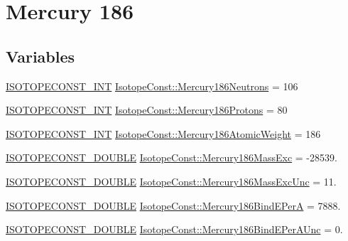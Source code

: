 \hypertarget{group___isotope_const-_mercury-_hg186}{}\section{Mercury 186}
\label{group___isotope_const-_mercury-_hg186}
\subsection*{Variables}
\begin{DoxyCompactItemize}
\item 
\mbox{\hyperlink{group___isotope_const-_macros_ga5f18360b3e99483a35c32d789e62621c}{I\+S\+O\+T\+O\+P\+E\+C\+O\+N\+S\+T\+\_\+\+I\+NT}} \mbox{\hyperlink{group___isotope_const-_mercury-_hg186_ga69b4b099cb39fcc9a1ffc39c8e504890}{Isotope\+Const\+::\+Mercury186\+Neutrons}} = 106
\item 
\mbox{\hyperlink{group___isotope_const-_macros_ga5f18360b3e99483a35c32d789e62621c}{I\+S\+O\+T\+O\+P\+E\+C\+O\+N\+S\+T\+\_\+\+I\+NT}} \mbox{\hyperlink{group___isotope_const-_mercury-_hg186_ga8940396a78f6a6de3cecfa06521c812c}{Isotope\+Const\+::\+Mercury186\+Protons}} = 80
\item 
\mbox{\hyperlink{group___isotope_const-_macros_ga5f18360b3e99483a35c32d789e62621c}{I\+S\+O\+T\+O\+P\+E\+C\+O\+N\+S\+T\+\_\+\+I\+NT}} \mbox{\hyperlink{group___isotope_const-_mercury-_hg186_ga7d94c8cda4bbcb1fbfac6de280e3be9b}{Isotope\+Const\+::\+Mercury186\+Atomic\+Weight}} = 186
\item 
\mbox{\hyperlink{group___isotope_const-_macros_ga8f45a7272ce02c0b4c65c44636ed719a}{I\+S\+O\+T\+O\+P\+E\+C\+O\+N\+S\+T\+\_\+\+D\+O\+U\+B\+LE}} \mbox{\hyperlink{group___isotope_const-_mercury-_hg186_gaa486a18381e5afef36969aa7e3eb75c1}{Isotope\+Const\+::\+Mercury186\+Mass\+Exc}} = -\/28539.
\item 
\mbox{\hyperlink{group___isotope_const-_macros_ga8f45a7272ce02c0b4c65c44636ed719a}{I\+S\+O\+T\+O\+P\+E\+C\+O\+N\+S\+T\+\_\+\+D\+O\+U\+B\+LE}} \mbox{\hyperlink{group___isotope_const-_mercury-_hg186_gae25530b5104aa4a4f2bf1f048fb3f1d6}{Isotope\+Const\+::\+Mercury186\+Mass\+Exc\+Unc}} = 11.
\item 
\mbox{\hyperlink{group___isotope_const-_macros_ga8f45a7272ce02c0b4c65c44636ed719a}{I\+S\+O\+T\+O\+P\+E\+C\+O\+N\+S\+T\+\_\+\+D\+O\+U\+B\+LE}} \mbox{\hyperlink{group___isotope_const-_mercury-_hg186_ga33b37a713fa48aa05988b28356fa424e}{Isotope\+Const\+::\+Mercury186\+Bind\+E\+PerA}} = 7888.
\item 
\mbox{\hyperlink{group___isotope_const-_macros_ga8f45a7272ce02c0b4c65c44636ed719a}{I\+S\+O\+T\+O\+P\+E\+C\+O\+N\+S\+T\+\_\+\+D\+O\+U\+B\+LE}} \mbox{\hyperlink{group___isotope_const-_mercury-_hg186_ga044223d9a740e4694ee1089aea52a47d}{Isotope\+Const\+::\+Mercury186\+Bind\+E\+Per\+A\+Unc}} = 0.

\end{DoxyCompactItemize}
